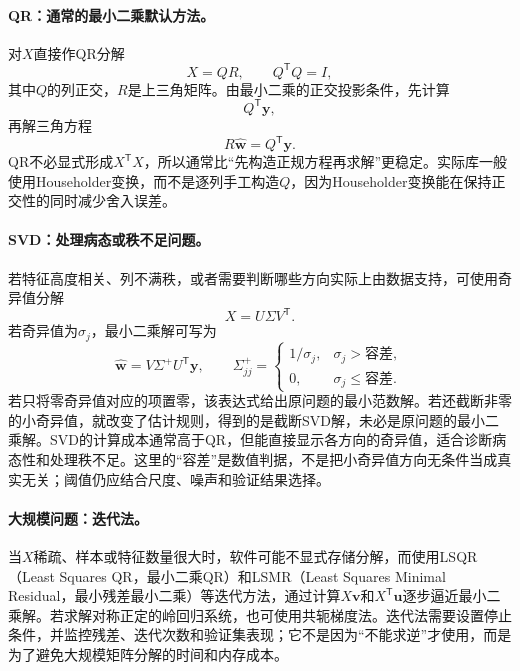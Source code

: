 \paragraph{QR：通常的最小二乘默认方法。}
对$X$直接作QR分解
\begin{equation}
 X=QR,
 \qquad Q^{\mathsf T}Q=I,
\end{equation}
其中$Q$的列正交，$R$是上三角矩阵。由最小二乘的正交投影条件，先计算
\begin{equation}
 Q^{\mathsf T}\bm y,
\end{equation}
再解三角方程
\begin{equation}
 R\hat{\bm w}=Q^{\mathsf T}\bm y.
\end{equation}
QR不必显式形成$X^{\mathsf T}X$，所以通常比“先构造正规方程再求解”更稳定。实际库一般使用Householder变换，而不是逐列手工构造$Q$，因为Householder变换能在保持正交性的同时减少舍入误差。

\paragraph{SVD：处理病态或秩不足问题。}
若特征高度相关、列不满秩，或者需要判断哪些方向实际上由数据支持，可使用奇异值分解
\begin{equation}
 X=U\Sigma V^{\mathsf T}.
\end{equation}
若奇异值为$\sigma_j$，最小二乘解可写为
\begin{equation}
 \hat{\bm w}=V\Sigma^+U^{\mathsf T}\bm y,
 \qquad
 \Sigma^+_{jj}=\begin{cases}
 1/\sigma_j,&\sigma_j>\text{容差},\\
 0,&\sigma_j\leq\text{容差}.
 \end{cases}
\end{equation}
若只将零奇异值对应的项置零，该表达式给出原问题的最小范数解。若还截断非零的小奇异值，就改变了估计规则，得到的是截断SVD解，未必是原问题的最小二乘解。SVD的计算成本通常高于QR，但能直接显示各方向的奇异值，适合诊断病态性和处理秩不足。这里的“容差”是数值判据，不是把小奇异值方向无条件当成真实无关；阈值仍应结合尺度、噪声和验证结果选择。

\paragraph{大规模问题：迭代法。}
当$X$稀疏、样本或特征数量很大时，软件可能不显式存储分解，而使用LSQR（Least Squares QR，最小二乘QR）和LSMR（Least Squares Minimal Residual，最小残差最小二乘）等迭代方法，通过计算$X\bm v$和$X^{\mathsf T}\bm u$逐步逼近最小二乘解。若求解对称正定的岭回归系统，也可使用共轭梯度法。迭代法需要设置停止条件，并监控残差、迭代次数和验证集表现；它不是因为“不能求逆”才使用，而是为了避免大规模矩阵分解的时间和内存成本。

